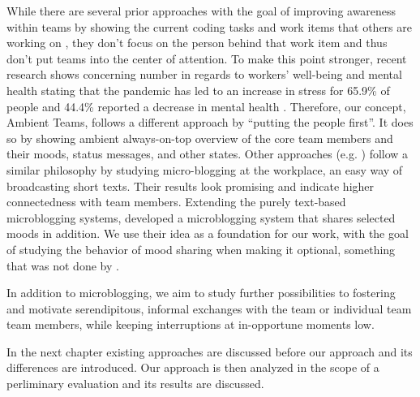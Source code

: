 While there are several prior approaches with the goal of improving awareness within teams by showing the current coding tasks and work items that others are working on \autocite{biehl2007fastdash, jakobsen2009wipdash}, they don't focus on the person behind that work item and thus don't put teams into the center of attention. To make this point stronger, recent research shows concerning number in regards to workers' well-being and mental health stating that the pandemic has led to an increase in stress for 65.9\% of people and 44.4\% reported a decrease in mental health \autocite{qualtricksmental}. Therefore, our concept, Ambient Teams, follows a different approach by ``putting the people first''. It does so by showing ambient always-on-top overview of the core team members and their moods, status messages, and other states. Other approaches (e.g. \autocite{ehrlich2010microblogging, ebner2008microblogging, zhang2010case}) follow a similar philosophy by studying micro-blogging at the workplace, an easy way of broadcasting short texts. Their results look promising and indicate higher connectedness with team members. Extending the purely text-based microblogging systems, \textcite{dullemond2013fixing} developed a microblogging system that shares selected moods in addition. We use their idea as a foundation for our work, with the goal of studying the behavior of mood sharing when making it optional, something that was not done by \textcite{dullemond2013fixing}.

In addition to microblogging, we aim to study further possibilities to fostering and motivate serendipitous, informal exchanges with the team or individual team team members, while keeping interruptions at in-opportune moments low.

In the next chapter existing approaches are discussed before our approach and its differences are introduced. Our approach is then analyzed in the scope of a perliminary evaluation and its results are discussed.


